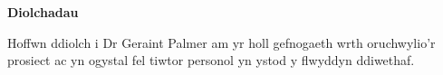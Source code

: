 \Huge{\textbf{Diolchadau}}

\normalsize

\vspace{1.5cm}

Hoffwn ddiolch i Dr Geraint Palmer am yr holl gefnogaeth wrth oruchwylio'r prosiect ac yn ogystal fel tiwtor personol yn ystod y flwyddyn ddiwethaf. 